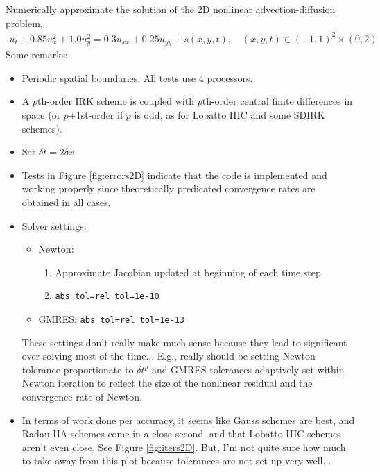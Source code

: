 \documentclass[review]{siamart}
\begin{document}
Numerically approximate the solution of the 2D nonlinear advection-diffusion problem,
\begin{align}
u_t + 0.85 u^2_x + 1.0 u^2_y = 0.3 u_{xx} + 0.25 u_{yy}  + s(x,y,t),
\quad (x,y,t) \in  (-1,1)^2 \times (0, 2)
\end{align}
Some remarks:
\begin{itemize}
\setlength\itemsep{0.5em}
\item Periodic spatial boundaries. All tests use 4 processors.

\item A $p$th-order IRK scheme is coupled with $p$th-order central finite differences in space (or $p$+1st-order if $p$ is odd, as for Lobatto IIIC and some SDIRK schemes).

\item Set $\delta t = 2 \delta x$

\item Tests in Figure \ref{fig:errors2D} indicate that the code is implemented and working properly since theoretically predicated convergence rates are obtained in all cases.

\item Solver settings:
\begin{itemize}
\setlength\itemsep{0.5em}
\item Newton: 
\begin{enumerate}
\item Approximate Jacobian updated at beginning of each time step
\item  \texttt{abs tol=rel tol=1e-10}
\end{enumerate}

\item GMRES: \texttt{abs tol=rel tol=1e-13}
\end{itemize}

These settings don't really make much sense because they lead to significant over-solving most of the time... E.g., really should be setting Newton tolerance proportionate to $\delta t^p$ and GMRES tolerances adaptively set within Newton iteration to reflect the size of the nonlinear residual and the convergence rate of Newton.

\item In terms of work done per accuracy, it seems like Gauss schemes are best, and Radau IIA schemes come in a close second, and that Lobatto IIIC schemes aren't even close. See Figure \ref{fig:iters2D}. But, I'm not quite sure how much to take away from this plot because tolerances are not set up very well...


\end{itemize}
\end{document}
